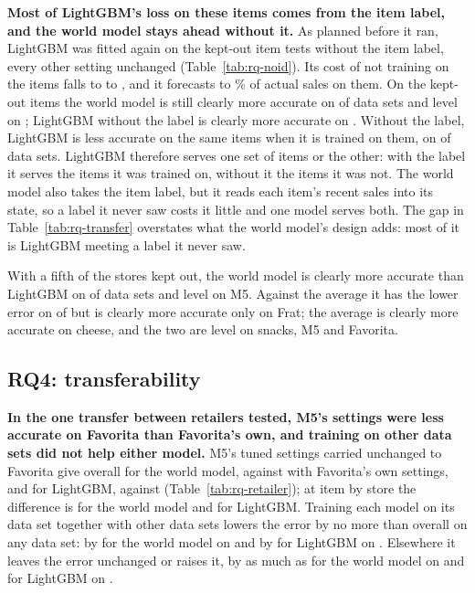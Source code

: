 \textbf{Most of LightGBM's loss on these items comes from the item label, and the
world model stays ahead without it.} As planned before it ran, LightGBM was fitted
again on the kept-out item tests without the item label, every other setting
unchanged (Table~\ref{tab:rq-noid}). Its cost of not training on the items falls to
\rqNoidCostLo{} to \rqNoidCostHi{}, and it forecasts \rqNoidFaLo{} to \rqNoidFaHi\% of actual sales on them. On the
kept-out items the world model is still clearly more accurate on \rqWmBeatsNoid{} of
\rqNoidSets{} data sets and level on \rqWmNoidLevelSets{}; LightGBM without the label is clearly more
accurate on \rqNoidBeatsWm{}. Without the label, LightGBM is less accurate on the same items
when it is trained on them, on \rqNoidSeenWorse{} of \rqNoidSets{} data sets. LightGBM therefore serves one set of items or the other: with
the label it serves the items it was trained on, without it the items it was not.
The world model also takes the item label, but it reads each item's recent sales
into its state, so a label it never saw costs it little and one model serves both.
The gap in Table~\ref{tab:rq-transfer} overstates what the world model's design adds: most of it
is LightGBM meeting a label it never saw.

With a fifth of the stores kept out, the world model is clearly more accurate
than LightGBM on \rqStoreWmBeatsLgb{} of \rqKeptSets{} data sets and level on M5. Against the average it
has the lower error on \rqStoreWmLowest{} of \rqKeptSets{} but is clearly more accurate only on Frat; the
average is clearly more accurate on cheese, and the two are level on snacks, M5
and Favorita.




\subsection{RQ4: transferability}
\label{sec:rq-transfer}

\textbf{In the one transfer between retailers tested, M5's settings were
less accurate on Favorita than Favorita's own, and training on other data sets did not help
either model.} M5's tuned settings carried unchanged to
Favorita give \rqCarriedWm{} overall for the world model, against \rqOwnWm{} with Favorita's own
settings, and \rqCarriedLgb{} for LightGBM, against \rqOwnLgb{} (Table~\ref{tab:rq-retailer});
at item by store the difference is \rqCarriedWmIxs{} for the world model and \rqCarriedLgbIxs{} for
LightGBM. Training each model on its data set together with other data sets
lowers the error by no more than \rqPoolGainMax{} overall on any data set: by \rqPoolGainWm{} for the
world model on \rqPoolGainWmSet{} and by \rqPoolGainLgb{} for LightGBM on \rqPoolGainLgbSet{}. Elsewhere
it leaves the error unchanged or raises it, by as much as \rqPoolLossWm{} for the world model on \rqPoolLossWmSet{} and
\rqPoolLossLgb{} for LightGBM on \rqPoolLossLgbSet{}.

